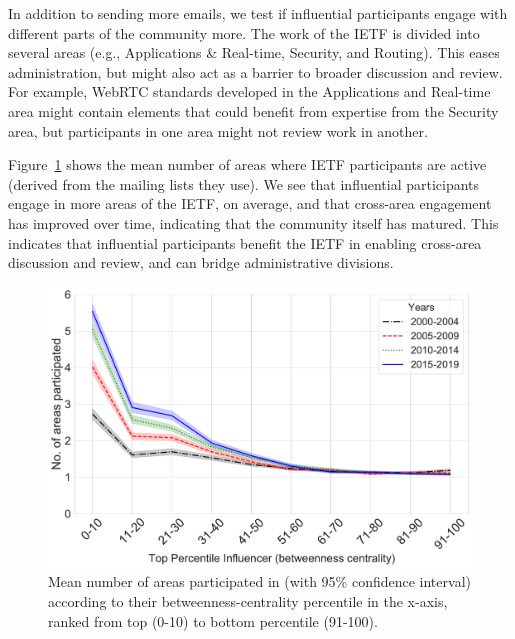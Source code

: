 \documentclass[twocolumn,10pt]{article}
\newlength{\figureWidthOneColumn}
\newcommand{\pb}[1]{\vspace{0.75ex}\noindent{\textbf{#1}}}
\begin{document}
\pb{Cross-area review} 
In addition to sending more emails, we test if influential participants
engage with different parts of the community more. The work of the IETF is
divided into several areas (e.g., Applications \& Real-time, Security, and
Routing). This eases administration, but might also act as a barrier to
broader discussion and review. For example, WebRTC standards developed in
the Applications and Real-time area might contain elements that could
benefit from expertise from the Security area, but participants in one area
might not review work in another. 

Figure~\ref{fig:areas_participation_top_percentile} shows the mean number
of areas where IETF participants are active (derived from the mailing lists
they use).  We see that influential participants engage in more areas of
the IETF, on average, and that cross-area engagement has improved over
time, indicating that the community itself has matured. This indicates that
influential participants benefit the IETF in enabling cross-area discussion
and review, and can bridge administrative divisions.

\begin{figure}
  \centering
  \includegraphics[width=\figureWidthOneColumn]{figures-prev/icwsm-2022/lineplot_avg_areas_top_percentile.pdf}
  \caption{
    Mean number of areas participated in (with 95\% confidence interval)
    according to their betweenness-centrality percentile in the x-axis,
    ranked from top (0-10) to bottom percentile (91-100).
  }
  \label{fig:areas_participation_top_percentile}
\end{figure}
\end{document}
